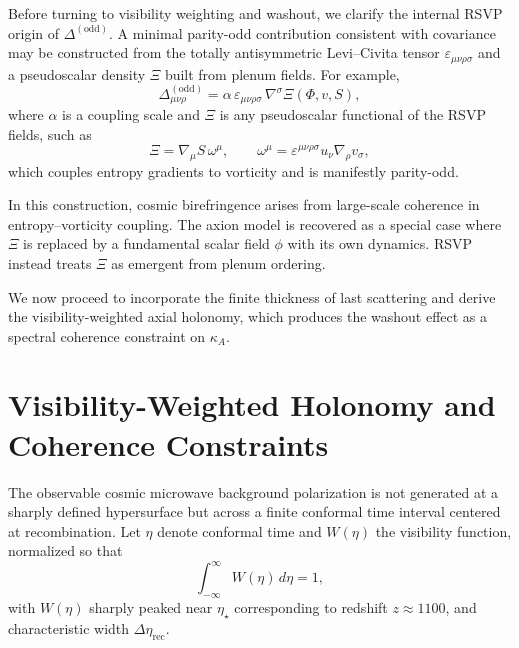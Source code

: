 \documentclass[12pt]{article}
\begin{document}
Before turning to visibility weighting and washout, we clarify the internal RSVP origin of $\Delta^{(\text{odd})}$. A minimal parity-odd contribution consistent with covariance may be constructed from the totally antisymmetric Levi--Civita tensor $\varepsilon_{\mu\nu\rho\sigma}$ and a pseudoscalar density $\Xi$ built from plenum fields. For example,
\begin{equation}
\Delta^{(\text{odd})}_{\mu\nu\rho}
=
\alpha
\, \varepsilon_{\mu\nu\rho\sigma}
\, \nabla^\sigma \Xi(\Phi, v, S),
\end{equation}
where $\alpha$ is a coupling scale and $\Xi$ is any pseudoscalar functional of the RSVP fields, such as
\begin{equation}
\Xi
=
\nabla_\mu S \, \omega^\mu,
\qquad
\omega^\mu
=
\varepsilon^{\mu\nu\rho\sigma}
u_\nu \nabla_\rho v_\sigma,
\end{equation}
which couples entropy gradients to vorticity and is manifestly parity-odd.

In this construction, cosmic birefringence arises from large-scale coherence in entropy–vorticity coupling. The axion model is recovered as a special case where $\Xi$ is replaced by a fundamental scalar field $\phi$ with its own dynamics. RSVP instead treats $\Xi$ as emergent from plenum ordering.

We now proceed to incorporate the finite thickness of last scattering and derive the visibility-weighted axial holonomy, which produces the washout effect as a spectral coherence constraint on $\kappa_A$.

\newpage
\section{Visibility-Weighted Holonomy and Coherence Constraints}

The observable cosmic microwave background polarization is not generated at a sharply defined hypersurface but across a finite conformal time interval centered at recombination. Let $\eta$ denote conformal time and $W(\eta)$ the visibility function, normalized so that
\begin{equation}
\int_{-\infty}^{\infty} W(\eta)\, d\eta = 1,
\end{equation}
with $W(\eta)$ sharply peaked near $\eta_\star$ corresponding to redshift $z \approx 1100$, and characteristic width $\Delta\eta_{\mathrm{rec}}$.
\end{document}
